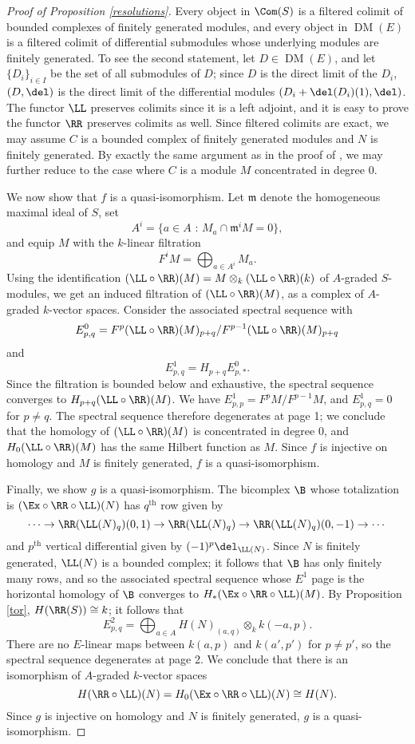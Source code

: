 \documentclass[12pt]{amsart}
\theoremstyle{definition}
\theoremstyle{remark}
\newcommand{\m}{\mathfrak m}
\def\on{\operatorname}
\def\DM{\operatorname{DM}}
\def\th{\on{th}}
\begin{document}
\begin{proof}[Proof of Proposition \ref{resolutions}]
Every object in $\Com(S)$ is a filtered colimit of bounded complexes of finitely generated modules, and every object in $\DM(E)$ is a filtered colimit of differential submodules whose underlying modules are finitely generated. To see the second statement, let $D \in \DM(E)$, and let $\{D_i \}_{i \in I}$ be the set of all submodules of $D$; since $D$ is the direct limit of the $D_i$, $(D, \del)$ is the direct limit of the differential modules $(D_i + \del(D_i)(1), \del)$. The functor $\LL$ preserves colimits since it is a left adjoint, and it is easy to prove the functor $\RR$ preserves colimits as well. Since filtered colimits are exact, we may assume $C$ is a bounded complex of finitely generated modules and $N$ is finitely generated. By exactly the same argument as in the proof of \cite[Theorem 2.6]{EFS}, we may further reduce to the case where $C$ is a module $M$ concentrated in degree 0. 

We now show that $f$ is a quasi-isomorphism. Let $\m$ denote the homogeneous maximal ideal of $S$, set
$$
A^i = \{ a \in A \text{ : } M_a \cap \m^i M = 0\},
$$
and equip $M$ with the $k$-linear filtration 
$$
F^i M = \bigoplus_{a \in A^i} M_a.
$$
Using the identification $(\LL \circ \RR)(M) = M \otimes_k (\LL \circ \RR)(k)$ of $A$-graded $S$-modules, we get an induced filtration of $(\LL \circ \RR)(M)$, as a complex of $A$-graded $k$-vector spaces. Consider the associated spectral sequence with
$$
E^0_{p,q} = F^p (\LL \circ \RR)(M)_{p + q} / F^{p-1} (\LL \circ \RR)(M)_{p + q} 
$$
and
$$
E^1_{p,q} = H_{p + q} E^0_{p,*}.
$$
Since the filtration is bounded below and exhaustive, the spectral sequence converges to $H_{p+q}(\LL \circ \RR)(M)$. We have $E^1_{p,p} = F^p M / F^{p-1}M$, and $E^1_{p,q} = 0$ for $p \ne q$. The spectral sequence therefore degenerates at page 1; we conclude that the homology of $(\LL \circ \RR)(M)$ is concentrated in degree 0, and $H_0(\LL \circ \RR)(M)$ has the same Hilbert function as $M$. Since $f$ is injective on homology and $M$ is finitely generated, $f$ is a quasi-isomorphism.

Finally, we show $g$ is a quasi-isomorphism. The bicomplex $\B$ whose totalization is $(\Ex \circ \RR \circ \LL)(N)$ has $q^{\th}$ row given by
$$
\cdots \to \RR( \LL(N)_q ) (0, 1) \to \RR( \LL(N)_q ) \to \RR( \LL(N)_q ) (0, -1) \to \cdots
$$
and $p^{\th}$ vertical differential given by $(-1)^p\del_{\LL(N)}$. Since $N$ is finitely generated, $\LL(N)$ is a bounded complex; it follows that $\B$ has only finitely many rows, and so the associated spectral sequence whose $E^1$ page is the horizontal homology of $\B$ converges to $H_*(\Ex \circ \RR \circ \LL)(M)$. By Proposition \ref{tor}, $H(\RR(S)) \cong k$; it follows that
$$
E^2_{p,q} = \bigoplus_{a \in A} H(N)_{(a, q)} \otimes_k k(-a, p). 
$$
There are no $E$-linear maps between $k(a, p)$ and $k(a', p')$ for $p \ne p'$, so the spectral sequence degenerates at page 2. We conclude that there is an isomorphism of $A$-graded $k$-vector spaces
$$
H(\RR \circ \LL)(N) = H_0(\Ex \circ \RR \circ \LL)(N) \cong H(N).
$$
Since $g$ is injective on homology and $N$ is finitely generated, $g$ is a quasi-isomorphism.
\end{proof}
\end{document}
